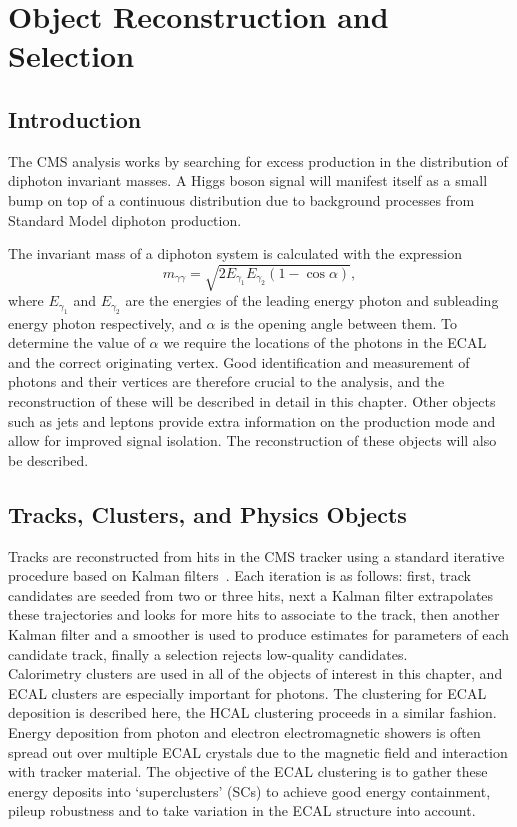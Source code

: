 \chapter{Object Reconstruction and Selection}
\label{chap:object_reco}

\section{Introduction}
The CMS \Hgg analysis works by searching for excess production in the distribution of diphoton invariant masses. A Higgs boson signal will manifest itself as a small bump on top of a continuous distribution due to background processes from Standard Model diphoton production.

The invariant mass of a diphoton system is calculated with the expression
\begin{equation}
    m_{\gamma\gamma} = \sqrt{2E_{\gamma_1}E_{\gamma_2}(1-\cos{\alpha})},
\end{equation}
where $E_{\gamma_1}$ and $E_{\gamma_2}$ are the energies of the leading energy photon and subleading energy photon respectively, and $\alpha$ is the opening angle between them. 
To determine the value of $\alpha$ we require the locations of the photons in the ECAL and the correct originating vertex. 
Good identification and measurement of photons and their vertices are therefore crucial to the analysis, and the reconstruction of these will be described in detail in this chapter. 
Other objects such as jets and leptons provide extra information on the production mode and allow for improved signal isolation. The reconstruction of these objects will also be described.

\section{Tracks, Clusters, and Physics Objects}
Tracks are reconstructed from hits in the CMS tracker using a standard iterative procedure based on Kalman filters~\cite{TrackReco}. 
Each iteration is as follows: first, track candidates are seeded from two or three hits, next a Kalman filter extrapolates these trajectories and looks for more hits to associate to the track,
then another Kalman filter and a smoother is used to produce estimates for parameters of each candidate track, finally a selection rejects low-quality candidates.  
\\

Calorimetry clusters are used in all of the objects of interest in this chapter, and ECAL clusters are especially important for photons. 
The clustering for ECAL deposition is described here, the HCAL clustering proceeds in a similar fashion. 
Energy deposition from photon and electron electromagnetic showers is often spread out over multiple ECAL crystals due to the magnetic field and interaction with tracker material. 
The objective of the ECAL clustering is to gather these energy deposits into `superclusters' (SCs) to achieve good energy containment, pileup robustness and to take variation in the ECAL structure into account.

